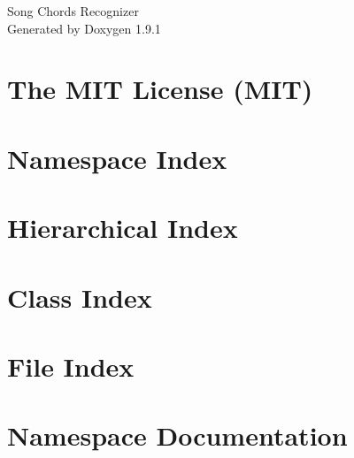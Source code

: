 \let\mypdfximage\pdfximage\def\pdfximage{\immediate\mypdfximage}\documentclass[twoside]{book}
\newcommand{\+}{\discretionary{\mbox{\scriptsize$\hookleftarrow$}}{}{}}
\newcommand{\clearemptydoublepage}{%
  \newpage{\pagestyle{empty}\cleardoublepage}%
}
\begin{document}
\raggedbottom

\hypersetup{pageanchor=false,
             bookmarksnumbered=true,
             pdfencoding=unicode
            }
\begin{titlepage}
\vspace*{7cm}
\begin{center}%
{\Large Song Chords Recognizer }\\
\vspace*{1cm}
{\large Generated by Doxygen 1.9.1}\\
\end{center}
\end{titlepage}
\clearemptydoublepage
{}
\tableofcontents
\clearemptydoublepage
{}
\hypersetup{pageanchor=true}

\chapter{The MIT License (MIT)}
\label{md__web_song_chords_recognizer_wwwroot_lib_jquery_validation__l_i_c_e_n_s_e}

\chapter{Namespace Index}

\chapter{Hierarchical Index}

\chapter{Class Index}

\chapter{File Index}

\chapter{Namespace Documentation}











\end{document}
